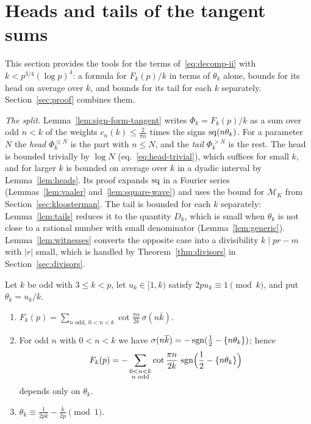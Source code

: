 \section{Heads and tails of the tangent sums}\label{sec:tangent}

This section provides the tools for the terms of~\eqref{eq:decomp-ii} with $k<p^{3/4}(\log p)^4$: a formula for
$F_k(p)/k$ in terms of $\theta_k$ alone, bounds for its head on average over $k$, and bounds for its tail for each $k$
separately. Section~\ref{sec:proof} combines them.

\emph{The split.} Lemma~\ref{lem:sign-form-tangent} writes $\Phi_k=F_k(p)/k$ as a sum over odd $n<k$ of the weights $c_n(k)\le\frac2{\pi n}$ times the signs $\operatorname{sq}(n\theta_k)$.
For a parameter $N$ the \emph{head} $\Phi_k^{\le N}$ is the part with $n\le N$, and the \emph{tail} $\Phi_k^{>N}$ is the rest.
The head is bounded trivially by $\log N$ (eq.~\eqref{eq:head-trivial}), which suffices for small $k$, and for larger $k$ is bounded on average over $k$ in a dyadic interval by Lemma~\ref{lem:heads}.
Its proof expands $\operatorname{sq}$ in a Fourier series (Lemmas~\ref{lem:vaaler} and~\ref{lem:square-wave}) and uses the bound for $\mathcal{M}_K$ from Section~\ref{sec:kloosterman}.
The tail is bounded for each $k$ separately: Lemma~\ref{lem:tails} reduces it to the quantity $D_k$, which is small when $\theta_k$ is not close to a rational number with small denominator (Lemma~\ref{lem:generic}).
Lemma~\ref{lem:witnesses} converts the opposite case into a divisibility $k\mid pr-m$ with $|r|$ small, which is handled by Theorem~\ref{thm:divisors} in Section~\ref{sec:divisors}.

\begin{lemma}\label{lem:sign-form-tangent}
Let $k$ be odd with $3\le k<p$, let $u_k\in[1,k)$ satisfy $2pu_k\equiv1\pmod k$, and put $\theta_k=u_k/k$.
\begin{enumerate}[label=\textup{(\alph*)},leftmargin=*]
\item $F_k(p)=\sum_{n\text{ odd},\,0<n<k}\cot\frac{\pi n}{2k}\,\sigma(n\overline{k})$.
\item For odd $n$ with $0<n<k$ we have $\sigma(n\overline{k})=-\operatorname{sgn}(\frac12-\{n\theta_k\})$; hence
\[
F_k(p)=-\sum_{\substack{0<n<k\\ n\text{ odd}}}\cot\frac{\pi n}{2k}\,\operatorname{sgn}\Bigl(\frac12-\{n\theta_k\}\Bigr)
\]
depends only on $\theta_k$.
\item $\theta_k\equiv\frac1{2pk}-\frac{\overline{k}}{2p}\pmod 1$.
\end{enumerate}
\end{lemma}

